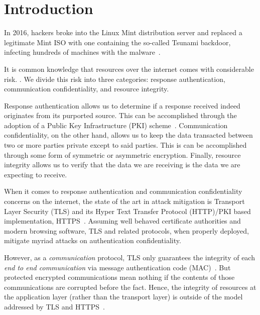 \section{Introduction} \label{sec:introduction}


In 2016, hackers broke into the Linux Mint distribution server and replaced a
legitimate Mint ISO with one containing the so-called Tsunami backdoor,
infecting hundreds of machines with the malware~\cite{SCA-MINT1, SCA-MINT2}. 

It is common knowledge that resources over the internet comes with considerable
risk. . We divide this risk into three
categories: response authentication, communication confidentiality, and resource
integrity.

Response authentication allows us to determine if a response received indeed
originates from its purported source. This can be accomplished through the
adoption of a Public Key Infrastructure (PKI) scheme~\cite{PKI}. Communication
confidentiality, on the other hand, allows us to keep the data transacted
between two or more parties private except to said parties. This is can be
accomplished through some form of symmetric or asymmetric encryption. Finally,
resource integrity allows us to verify that the data we are receiving is the
data we are expecting to receive.


When it comes to response authentication and communication confidentiality
concerns on the internet, the state of the art in attack mitigation is Transport
Layer Security (TLS) and its Hyper Text Transfer Protocol (HTTP)/PKI based
implementation, HTTPS~\cite{TLS1.2, TLS1, TLS0, HTTPS, PKI}. Assuming well
behaved certificate authorities and modern browsing software, TLS and related
protocols, when properly deployed, mitigate myriad attacks on authentication
confidentiality.

However, as a \textit{communication} protocol, TLS only guarantees the integrity
of each \textit{end to end communication} via message authentication code
(MAC)~\cite{TLS1.2}. But protected encrypted communications mean nothing if the
contents of those communications are corrupted before the fact. Hence, the
integrity of resources at the application layer (rather than the transport
layer) is outside of the model addressed by TLS and HTTPS~\cite{TLS1.2, HTTPS}.

